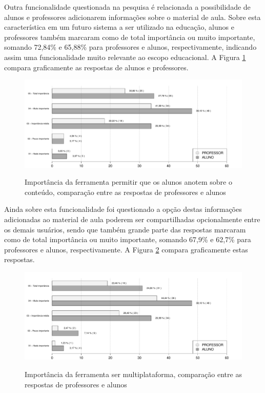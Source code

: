 Outra funcionalidade questionada na pesquisa é relacionada a possibilidade de alunos e professores adicionarem informações sobre o material de aula. Sobre esta característica em um futuro sistema a ser utilizado na educação, alunos e professores também marcaram como de total importância ou muito importante, somando 72,84\% e 65,88\% para professores e alunos, respectivamente, indicando assim uma funcionalidade muito relevante ao escopo educacional. A Figura \ref{fig:grafico_anotacoes} compara graficamente as respostas de alunos e professores. 

\begin{figure}[!h]
\centering
\caption{Importância da ferramenta permitir que os alunos anotem sobre o conteúdo, comparação entre as respostas de professores e alunos}
\includegraphics[width=1.0\textwidth]{pdfs/alunos-professores/funcionalidades-anotacoes.pdf} 
\label{fig:grafico_anotacoes} 
\end{figure}


Ainda sobre esta funcionalidade foi questionado a opção destas informações adicionadas ao material de aula poderem ser compartilhadas opcionalmente entre os demais usuários, sendo que também grande parte das respostas marcaram como de total importância ou muito importante, somando 67,9\% e 62,7\% para professores e alunos, respectivamente. A Figura \ref{fig:grafico_compartilhar_anotacoes} compara graficamente estas respostas.


\begin{figure}[!h]
\centering
\caption{Importância da ferramenta ser multiplataforma, comparação entre as respostas de professores e alunos}
\includegraphics[width=1.0\textwidth]{pdfs/alunos-professores/funcionalidades-compar-anotacoes.pdf} 
\label{fig:grafico_compartilhar_anotacoes} 
\end{figure}

